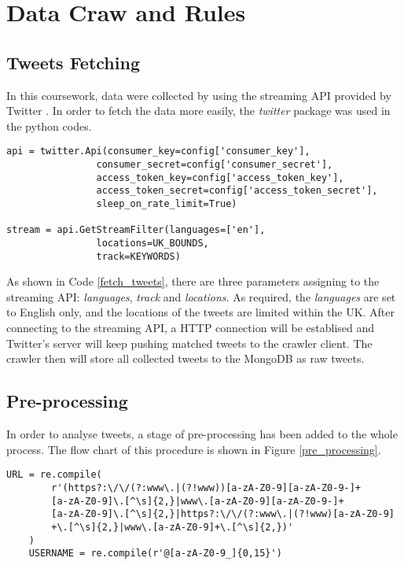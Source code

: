 \section{Data Craw and Rules}

\subsection{Tweets Fetching}

In this coursework, data were collected by using the streaming API provided by Twitter \cite{twitter_streaming}. In order to fetch the data more easily, the \textit{twitter} package was used in the python codes.


\begin{lstlisting}[caption={Fetch Tweets},captionpos=b,label={fetch_tweets}]
api = twitter.Api(consumer_key=config['consumer_key'],
                consumer_secret=config['consumer_secret'],
                access_token_key=config['access_token_key'],
                access_token_secret=config['access_token_secret'],
                sleep_on_rate_limit=True)

stream = api.GetStreamFilter(languages=['en'],
                locations=UK_BOUNDS,
                track=KEYWORDS)
\end{lstlisting}

As shown in Code \ref{fetch_tweets}, there are three parameters assigning to the streaming API: \textit{languages}, \textit{track} and \textit{locations}. As required, the \textit{languages} are set to English only, and the locations of the tweets are limited within the UK. After connecting to the streaming API, a HTTP connection will be establised and Twitter's server will keep pushing matched tweets to the crawler client. The crawler then will store all collected tweets to the MongoDB as raw tweets. 

\subsection{Pre-processing}

In order to analyse tweets, a stage of pre-processing has been added to the whole process. The flow chart of this procedure is shown in Figure \ref{pre_processing}.

\begin{lstlisting}[caption={Regular Expression},captionpos=b,label={regex}]
    URL = re.compile(
        r'(https?:\/\/(?:www\.|(?!www))[a-zA-Z0-9][a-zA-Z0-9-]+
        [a-zA-Z0-9]\.[^\s]{2,}|www\.[a-zA-Z0-9][a-zA-Z0-9-]+
        [a-zA-Z0-9]\.[^\s]{2,}|https?:\/\/(?:www\.|(?!www)[a-zA-Z0-9]
        +\.[^\s]{2,}|www\.[a-zA-Z0-9]+\.[^\s]{2,})'
    )
    USERNAME = re.compile(r'@[a-zA-Z0-9_]{0,15}')
\end{lstlisting}

